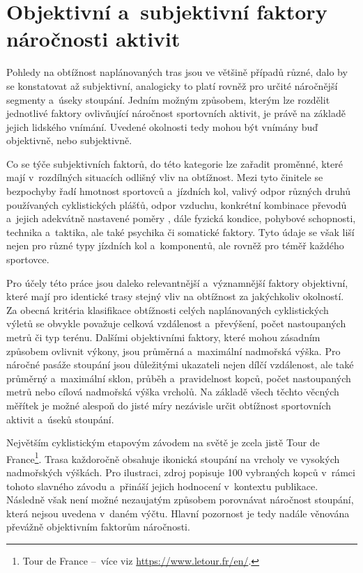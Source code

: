 \section{Objektivní a~subjektivní faktory náročnosti aktivit}
\label{objective-and-subjective-factors-of-activity-difficulty}

Pohledy na obtížnost naplánovaných tras jsou ve většině případů různé, dalo by se konstatovat až subjektivní, analogicky to platí rovněž pro určité náročnější segmenty a~úseky stoupání.
Jedním možným způsobem, kterým lze rozdělit jednotlivé faktory ovlivňující náročnost sportovních aktivit, je právě na základě jejich lidského vnímání.
Uvedené okolnosti tedy mohou být vnímány buď objektivně, nebo subjektivně.

Co se týče subjektivních faktorů, do této kategorie lze zařadit proměnné, které mají v~rozdílných situacích odlišný vliv na obtížnost.
Mezi tyto činitele se bezpochyby řadí hmotnost sportovců a~jízdních kol, valivý odpor různých druhů používaných cyklistických plášťů, odpor vzduchu, konkrétní kombinace převodů a~jejich adekvátně nastavené poměry \cite{SwainDavidP1998}, dále fyzická kondice, pohybové schopnosti, technika a~taktika, ale také psychika či somatické faktory.
Tyto údaje se však liší nejen pro různé typy jízdních kol a~komponentů, ale rovněž pro téměř každého sportovce.

Pro účely této práce jsou daleko relevantnější a~významnější faktory objektivní, které mají pro identické trasy stejný vliv na obtížnost za jakýchkoliv okolností.
Za obecná kritéria klasifikace obtížnosti celých naplánovaných cyklistických výletů se obvykle považuje celková vzdálenost a~převýšení, počet nastoupaných metrů či typ terénu.
Dalšími objektivními faktory, které mohou zásadním způsobem ovlivnit výkony, jsou průměrná a~maximální nadmořská výška.
Pro náročné pasáže stoupání jsou důležitými ukazateli nejen dílčí vzdálenost, ale také průměrný a~maximální sklon, průběh a~pravidelnost kopců, počet nastoupaných metrů nebo cílová nadmořská výška vrcholů.
Na základě všech těchto věcných měřítek je možné alespoň do jisté míry nezávisle určit obtížnost sportovních aktivit a~úseků stoupání.

Největším cyklistickým etapovým závodem na světě je zcela jistě Tour de France\footnote{Tour de France --~více viz \url{https://www.letour.fr/en/}.}.
Trasa každoročně obsahuje ikonická stoupání na vrcholy ve vysokých nadmořských výškách.
Pro ilustraci, zdroj \cite{WarrenSimon2014} popisuje 100 vybraných kopců v~rámci tohoto slavného závodu a~přináší jejich hodnocení v~kontextu publikace.
Následně však není možné nezaujatým způsobem porovnávat náročnost stoupání, která nejsou uvedena v~daném výčtu.
Hlavní pozornost je tedy nadále věnována převážně objektivním faktorům náročnosti.

